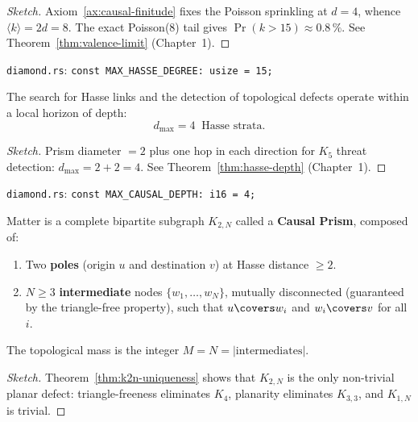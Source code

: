 \begin{proof}[Sketch]
Axiom~\ref{ax:causal-finitude} fixes the Poisson sprinkling
at $d = 4$, whence $\langle k\rangle = 2d = 8$. The
exact Poisson($8$) tail gives $\Pr(k > 15) \approx 0{.}8\,\%$.
See Theorem~\ref{thm:valence-limit} (Chapter~1).
\end{proof}

\medskip\noindent
\texttt{diamond.rs}: \texttt{const MAX\_HASSE\_DEGREE: usize = 15;}

\begin{theorem}
\label{thm:causal-locality}
The search for Hasse links and the detection of
topological defects operate within a local horizon of
depth:
\begin{equation}
  d_{\max} = 4 \;\;\text{Hasse strata.}
  \label{eq:ax-locality}
\end{equation}
\end{theorem}

\begin{proof}[Sketch]
Prism diameter $= 2$ plus one hop in each direction for
$K_5$ threat detection: $d_{\max} = 2 + 2 = 4$.
See Theorem~\ref{thm:hasse-depth} (Chapter~1).
\end{proof}

\medskip\noindent
\texttt{diamond.rs}: \texttt{const MAX\_CAUSAL\_DEPTH: i16 = 4;}

\begin{theorem}
\label{thm:bipartite-matter}
Matter is a complete bipartite subgraph $K_{2,N}$
called a \textbf{Causal Prism}, composed of:
\begin{enumerate}
  \item Two \textbf{poles} (origin $u$ and destination $v$) at Hasse
    distance $\geq 2$.
  \item $N \geq 3$ \textbf{intermediate} nodes $\{w_1,\ldots,w_N\}$,
    mutually disconnected (guaranteed by the
    triangle-free property), such that $u \covers w_i$ and
    $w_i \covers v$ for all $i$.
\end{enumerate}
The topological mass is the integer $M = N = |\text{intermediates}|$.
\end{theorem}

\begin{proof}[Sketch]
Theorem~\ref{thm:k2n-uniqueness} shows that $K_{2,N}$ is the
only non-trivial planar defect: triangle-freeness eliminates
$K_4$, planarity eliminates $K_{3,3}$, and $K_{1,N}$ is trivial.
\end{proof}

